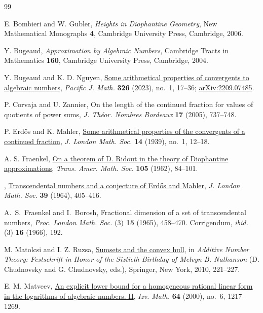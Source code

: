 \documentclass[11pt,reqno]{amsart}
\theoremstyle{definition}
\theoremstyle{plain}
\theoremstyle{definition}
\theoremstyle{remark}
\begin{document}
\begin{thebibliography}{99}

E. Bombieri and W. Gubler,
\emph{Heights in Diophantine Geometry},
New Mathematical Monographs \textbf{4}, Cambridge University Press,
Cambridge, 2006.

Y. Bugeaud,
\emph{Approximation by Algebraic Numbers},
Cambridge Tracts in Mathematics \textbf{160}, Cambridge University Press,
Cambridge, 2004.

Y. Bugeaud and K. D. Nguyen,
\href{https://doi.org/10.2140/pjm.2023.326.17}{Some arithmetical properties of convergents to algebraic numbers},
\emph{Pacific J. Math.} \textbf{326} (2023), no.~1, 17--36;
\href{https://arxiv.org/abs/2209.07485}{arXiv:2209.07485}.

 P. Corvaja and U. Zannier,
On the length of the continued fraction for values of
quotients of power sums,
\emph{J. Th\'eor. Nombres Bordeaux} \textbf{17}
(2005), 737--748.

P. Erd\H{o}s and K. Mahler,
\href{https://doi.org/10.1112/jlms/s1-14.1.12}{Some arithmetical properties of the convergents of a continued fraction},
\emph{J. London Math. Soc.} \textbf{14} (1939), no.~1, 12--18.

A. S. Fraenkel,
\href{https://doi.org/10.1090/S0002-9947-1962-0144852-2}{On a theorem of D. Ridout in the theory of Diophantine approximations},
\emph{Trans. Amer. Math. Soc.} \textbf{105} (1962), 84--101.

\bysame,
\href{https://doi.org/10.1112/jlms/s1-39.1.405}{Transcendental numbers and a conjecture of Erd\H{o}s and Mahler},
\emph{J. London Math. Soc.} \textbf{39} (1964), 405--416.

 A.~S.~Fraenkel and I.~Borosh, Fractional dimension of a set of transcendental numbers, \emph{Proc. London Math. Soc.} (3) \textbf{15} (1965), 458--470. Corrigendum, \emph{ibid.} (3) \textbf{16} (1966), 192.

M. Matolcsi and I. Z. Ruzsa,
\href{https://doi.org/10.1007/978-0-387-68361-4_16}{Sumsets and the convex hull},
in \emph{Additive Number Theory: Festschrift in Honor of the Sixtieth Birthday of Melvyn B. Nathanson}
(D. Chudnovsky and G. Chudnovsky, eds.), Springer, New York, 2010, 221--227.

E. M. Matveev,
\href{https://doi.org/10.1070/IM2000v064n06ABEH000314}{An explicit lower bound for a homogeneous rational linear form in the logarithms of algebraic numbers. II},
\emph{Izv. Math.} \textbf{64} (2000), no.~6, 1217--1269.


\end{thebibliography}
\end{document}
